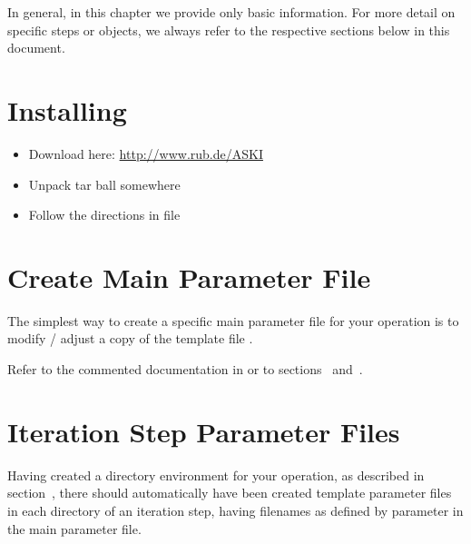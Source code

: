 %
%
%
In general, in this chapter we provide only basic information. For more detail on 
specific steps or objects, we always refer to the respective sections below in this document.
%
\section{Installing \ASKI} \label{basic_steps,sec:install_ASKI}
%
\begin{itemize}
\item Download here: \url{http://www.rub.de/ASKI}
\item Unpack tar ball somewhere
\item Follow the directions in file 
\end{itemize}
%
\section{Create Main Parameter File} \label{basic_steps,sec:main_parfile}
%
The simplest way to create a specific main parameter file for your operation is to modify / adjust 
a copy of the template file . 

Refer to the commented documentation in  or 
to sections~ and~.
%
\section{Iteration Step Parameter Files} \label{basic_steps,sec:iter_parfile}
%
Having created a directory environment for your operation, as described in section~,
there should automatically have been created template
parameter files in each directory of an iteration step, having filenames as defined by
parameter  in the main parameter file.


